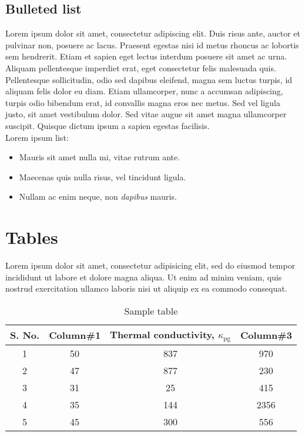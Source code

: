 \subsection{Bulleted list}
Lorem ipsum dolor sit amet, consectetur adipiscing elit. Duis risus ante, auctor et pulvinar non, posuere ac lacus. Praesent egestas nisi id metus rhoncus ac lobortis sem hendrerit. Etiam et sapien eget lectus interdum posuere sit amet ac urna. Aliquam pellentesque imperdiet erat, eget consectetur felis malesuada quis. Pellentesque sollicitudin, odio sed dapibus eleifend, magna sem luctus turpis, id aliquam felis dolor eu diam. Etiam ullamcorper, nunc a accumsan adipiscing, turpis odio bibendum erat, id convallis magna eros nec metus. Sed vel ligula justo, sit amet vestibulum dolor. Sed vitae augue sit amet magna ullamcorper suscipit. Quisque dictum ipsum a sapien egestas facilisis. \\ Lorem ipsum list:
\begin{itemize}
\item Mauris sit amet nulla mi, vitae rutrum ante.
\item Maecenas quis nulla risus, vel tincidunt ligula.
\item Nullam ac enim neque, non \emph{dapibus} mauris.
\end{itemize}

\section{Tables}
Lorem ipsum dolor sit amet, consectetur adipisicing elit, sed do eiusmod tempor incididunt ut labore et dolore magna aliqua. Ut enim ad minim veniam, quis nostrud exercitation ullamco laboris nisi ut aliquip ex ea commodo consequat.

\begin{table}[ht]
\caption{Sample table} %
\centering %
\begin{tabular}{c c c c}
\hline\hline %
S. No. & Column\#1 & Thermal conductivity, $\kappa_\mathrm{pg}$ & Column\#3 \\ [0.5ex]
\hline %
1 & 50 & 837 & 970 \\
2 & 47 & 877 & 230 \\
3 & 31 & 25 & 415 \\
4 & 35 & 144 & 2356 \\
5 & 45 & 300 & 556 \\ [1ex] %
\hline %
\end{tabular}
\label{table:nonlin} %
\end{table}

